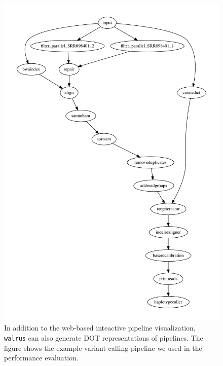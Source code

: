 \begin{figure}
    \centering
\includegraphics[width=\linewidth]{figures/graph.pdf}
    \caption[DOT representations of a pipeline in \texttt{walrus}]{In addition
    to the web-based inteactive pipeline visualization, \texttt{walrus} can also
    generate DOT representations of pipelines. The figure shows the example
    variant calling pipeline we used in the performance evaluation.} 
    \label{benchpipefigure}
\end{figure} 

